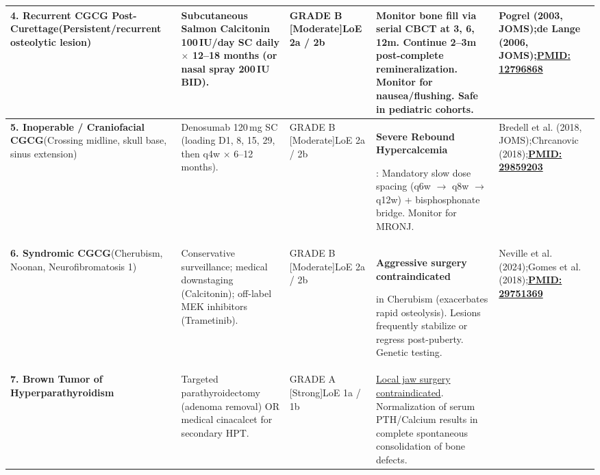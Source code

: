 \documentclass[9pt,a4paper]{article}
\newcommand{\hlr}[1]{\colorbox{hlred}{\strut\color{darkred}#1}}
\begin{document}
\begin{tabularx}{\linewidth}{>{\raggedright\arraybackslash}p{2.8cm} >{\raggedright\arraybackslash}p{3.8cm} >{\raggedright\arraybackslash}p{2.0cm} >{\raggedright\arraybackslash}p{5.1cm} >{\raggedright\arraybackslash}X}
\midrule
\textbf{4. Recurrent CGCG Post-Curettage}\newline\scriptsize (Persistent/recurrent osteolytic lesion) &
Subcutaneous Salmon Calcitonin 100\,IU/day SC daily $\times$ 12--18 months (or nasal spray 200\,IU BID). &
GRADE B [Moderate]\newline LoE 2a / 2b &
Monitor bone fill via serial CBCT at 3, 6, 12m. Continue 2--3m post-complete remineralization. Monitor for nausea/flushing. Safe in pediatric cohorts. &
Pogrel (2003, JOMS);\newline de Lange (2006, JOMS);\newline \href{https://pubmed.ncbi.nlm.nih.gov/12796868/}{\textbf{PMID: 12796868}} \\
\midrule
\textbf{5. Inoperable / Craniofacial CGCG}\newline\scriptsize (Crossing midline, skull base, sinus extension) &
Denosumab 120\,mg SC (loading D1, 8, 15, 29, then q4w $\times$ 6--12 months). &
GRADE B [Moderate]\newline LoE 2a / 2b &
\hlr{\textbf{Severe Rebound Hypercalcemia}}: Mandatory slow dose spacing (q6w $\rightarrow$ q8w $\rightarrow$ q12w) + bisphosphonate bridge. Monitor for MRONJ. &
Bredell et al. (2018, JOMS);\newline Chrcanovic (2018);\newline \href{https://pubmed.ncbi.nlm.nih.gov/29859203/}{\textbf{PMID: 29859203}} \\
\midrule
\textbf{6. Syndromic CGCG}\newline\scriptsize (Cherubism, Noonan, Neurofibromatosis 1) &
Conservative surveillance; medical downstaging (Calcitonin); off-label MEK inhibitors (Trametinib). &
GRADE B [Moderate]\newline LoE 2a / 2b &
\hlr{\textbf{Aggressive surgery contraindicated}} in Cherubism (exacerbates rapid osteolysis). Lesions frequently stabilize or regress post-puberty. Genetic testing. &
Neville et al. (2024);\newline Gomes et al. (2018);\newline \href{https://pubmed.ncbi.nlm.nih.gov/29751369/}{\textbf{PMID: 29751369}} \\
\midrule
\textbf{7. Brown Tumor of Hyperparathyroidism} &
Targeted parathyroidectomy (adenoma removal) OR medical cinacalcet for secondary HPT. &
GRADE A [Strong]\newline LoE 1a / 1b &
\underline{Local jaw surgery contraindicated}. Normalization of serum PTH/Calcium results in complete spontaneous consolidation of bone defects. &

\end{tabularx}
\end{document}
